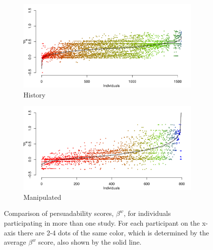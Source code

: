 \documentclass[9pt,a4paper,twocolumn,lineno]{article}
\begin{document}
\begin{figure}
	\centering
	\begin{subfigure}{1\linewidth}
		\centering
		\includegraphics[width=1\linewidth]{beta_history}
		\caption{\footnotesize History}
		\label{fig: betaw history}
	\end{subfigure}
	\begin{subfigure}{1\linewidth}
		\centering
		\includegraphics[width=1\linewidth]{beta_max}
		\caption{\footnotesize Manipulated}
		\label{fig: betaw manipulated}
	\end{subfigure}
	\caption{Comparison of persuadability scores, $\beta^w$, for individuals participating in more than one study. For each participant on the x-axis there are 2-4 dots of the same color, which is determined by the average $\beta^w$ score, also shown by the solid line.}
	\label{compare}
\end{figure}

\newpage
\end{document}
